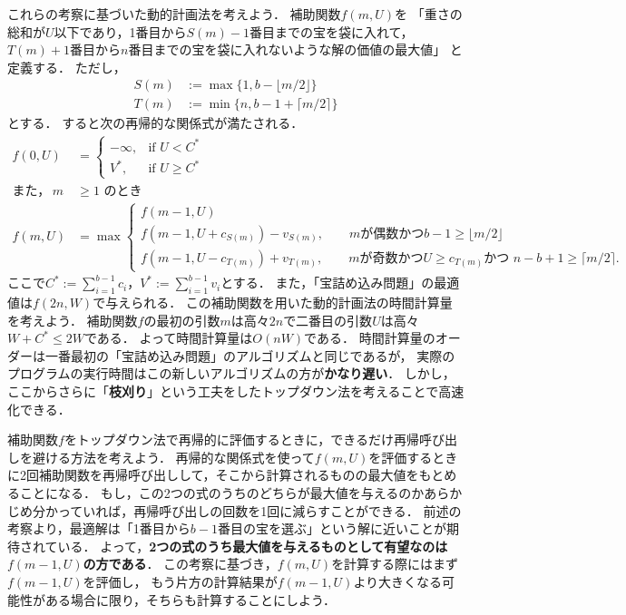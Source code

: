 \documentclass[a4paper,twoside,onecolumn,openany,article]{memoir}
\theoremstyle{remark}
\begin{document}
これらの考察に基づいた動的計画法を考えよう．
補助関数$f(m, U)$を
「重さの総和が$U$以下であり，1番目から$S(m)-1$番目までの宝を袋に入れて，$T(m)+1$番目から$n$番目までの宝を袋に入れないような解の価値の最大値」
と定義する．
ただし，
\begin{align*}
S(m)&:=\max\{1, b-\lfloor m/2\rfloor\}\\
T(m)&:=\min\{n, b-1+\lceil m/2\rceil\}
\end{align*}
とする．
すると次の再帰的な関係式が満たされる．
\begin{align*}
f(0,U)&=
\begin{cases}
-\infty,& \text{if } U < C^*\\
V^*,& \text{if } U \ge C^*
\end{cases}\\
\text{また，}\, m&\ge 1\text{ のとき}\\
f(m,U)&= \max
\begin{cases}
f(m-1,U)\\
f(m-1,U+c_{S(m)})-v_{S(m)},\qquad\text{$m$が偶数かつ$b-1\ge \lfloor m/2\rfloor$}\\
f(m-1,U-c_{T(m)})+v_{T(m)},\qquad\text{$m$が奇数かつ$U\ge c_{T(m)}$かつ $n-b+1\ge \lceil m/2\rceil$.}
\end{cases}
\end{align*}
ここで$C^*:=\sum_{i=1}^{b-1} c_i$，$V^*:=\sum_{i=1}^{b-1} v_i$とする．
また，「宝詰め込み問題」の最適値は$f(2n,W)$で与えられる．
この補助関数を用いた動的計画法の時間計算量を考えよう．
補助関数$f$の最初の引数$m$は高々$2n$で二番目の引数$U$は高々$W+C^*\le 2W$である．
よって時間計算量は$O(nW)$である．
時間計算量のオーダーは一番最初の「宝詰め込み問題」のアルゴリズムと同じであるが，
実際のプログラムの実行時間はこの新しいアルゴリズムの方が\textbf{かなり遅い}．
しかし，ここからさらに「\textbf{枝刈り}」という工夫をしたトップダウン法を考えることで高速化できる．

補助関数$f$をトップダウン法で再帰的に評価するときに，できるだけ再帰呼び出しを避ける方法を考えよう．
再帰的な関係式を使って$f(m,U)$を評価するときに2回補助関数を再帰呼び出しして，そこから計算されるものの最大値をもとめることになる．
もし，この2つの式のうちのどちらが最大値を与えるのかあらかじめ分かっていれば，再帰呼び出しの回数を1回に減らすことができる．
前述の考察より，最適解は「1番目から$b-1$番目の宝を選ぶ」という解に近いことが期待されている．
よって，\textbf{2つの式のうち最大値を与えるものとして有望なのは$f(m-1,U)$の方である}．
この考察に基づき，$f(m,U)$を計算する際にはまず$f(m-1,U)$を評価し，
もう片方の計算結果が$f(m-1,U)$より大きくなる可能性がある場合に限り，そちらも計算することにしよう．
\end{document}
